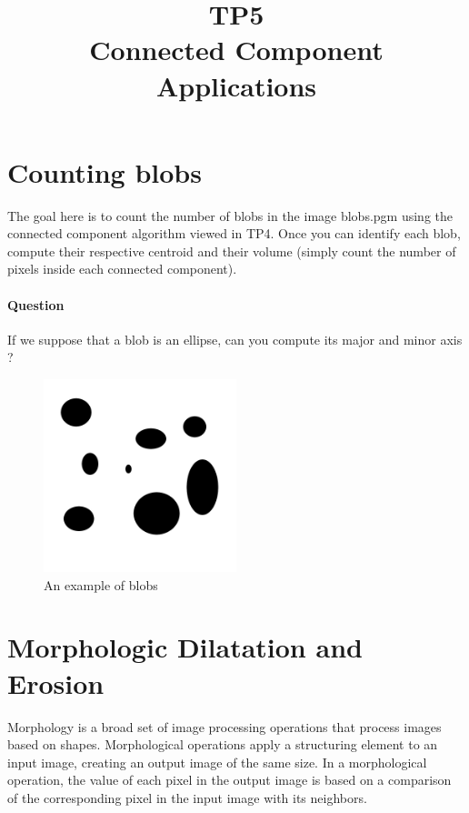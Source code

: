 \documentclass[a4paper, 11pt]{article}
\title{\bf{TP5 \\ Connected Component Applications}}
\author{}
\date{}
\begin{document}
\maketitle

\section*{\bf Counting blobs}

The goal here is to count the number of blobs in the image blobs.pgm using the connected component algorithm viewed in TP4.
Once you can identify each blob, compute their respective centroid and their volume (simply count the number of pixels inside each connected component).

\paragraph{Question} If we suppose that a blob is an ellipse, can you compute its major and minor axis ?

\begin{figure}
  \centering
  \includegraphics[width=0.5\textwidth]{blobs}
  \caption{An example of blobs}
\end{figure}

\section*{\bf Morphologic Dilatation and Erosion}

Morphology is a broad set of image processing operations that process images based on shapes. 
Morphological operations apply a structuring element to an input image, creating an output image of the same size. 
In a morphological operation, the value of each pixel in the output image is based on a comparison of the corresponding pixel in the input image with its neighbors. 
\end{document}
